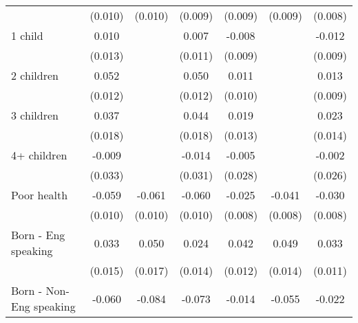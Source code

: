 {\begin{tabular}{l*{6}{c}}
                    &     (0.010)         &     (0.010)         &     (0.009)         &     (0.009)         &     (0.009)         &     (0.008)         \\
1 child             &       0.010         &                     &       0.007         &      -0.008         &                     &      -0.012         \\
                    &     (0.013)         &                     &     (0.011)         &     (0.009)         &                     &     (0.009)         \\
2 children          &       0.052\sym{***}&                     &       0.050\sym{***}&       0.011         &                     &       0.013         \\
                    &     (0.012)         &                     &     (0.012)         &     (0.010)         &                     &     (0.009)         \\
3 children          &       0.037\sym{**} &                     &       0.044\sym{**} &       0.019         &                     &       0.023         \\
                    &     (0.018)         &                     &     (0.018)         &     (0.013)         &                     &     (0.014)         \\
4+ children         &      -0.009         &                     &      -0.014         &      -0.005         &                     &      -0.002         \\
                    &     (0.033)         &                     &     (0.031)         &     (0.028)         &                     &     (0.026)         \\
Poor health         &      -0.059\sym{***}&      -0.061\sym{***}&      -0.060\sym{***}&      -0.025\sym{***}&      -0.041\sym{***}&      -0.030\sym{***}\\
                    &     (0.010)         &     (0.010)         &     (0.010)         &     (0.008)         &     (0.008)         &     (0.008)         \\
Born - Eng speaking &       0.033\sym{**} &       0.050\sym{***}&       0.024\sym{*}  &       0.042\sym{***}&       0.049\sym{***}&       0.033\sym{***}\\
                    &     (0.015)         &     (0.017)         &     (0.014)         &     (0.012)         &     (0.014)         &     (0.011)         \\
Born - Non-Eng speaking&      -0.060\sym{***}&      -0.084\sym{***}&      -0.073\sym{***}&      -0.014         &      -0.055\sym{***}&      -0.022\sym{**} \\

\end{tabular}}
